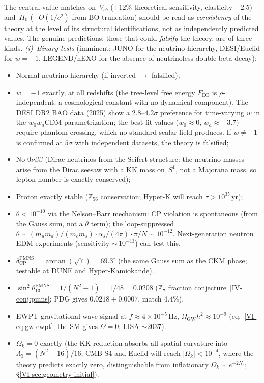 \noindent
The central-value matches on~$V_{cb}$
($\pm 12\%$ theoretical sensitivity, elasticity $-2.5$) and~$H_0$
($\pm O(1/c^2)$ from BO truncation) should be read as
\emph{consistency} of the theory at the level of its
structural identifications, not as independently
predicted values.  The genuine predictions, those that
could \emph{falsify} the theory, are of three kinds.
\emph{(i)~Binary tests}
(imminent: JUNO for the neutrino hierarchy,
DESI/Euclid for $w = -1$,
LEGEND/nEXO for the absence of neutrinoless double beta decay):
\begin{itemize}
\item Normal neutrino hierarchy (if inverted $\to$ falsified);
\item $w = -1$ exactly, at all redshifts
  (the tree-level free energy $F_{\mathrm{DE}}$ is
  $\rho$-independent: a cosmological constant with no
  dynamical component).
  The DESI DR2 BAO data (2025) show a
  $2.8$--$4.2\sigma$ preference for time-varying $w$
  in the $w_0 w_a$CDM parametrization;
  the best-fit values ($w_0 \approx 0$, $w_a \approx -3.7$)
  require phantom crossing, which no standard scalar field
  produces.
  If $w \ne -1$ is confirmed at $5\sigma$ with independent
  datasets, the theory is falsified;
\item No $0\nu\beta\beta$ (Dirac neutrinos from the Seifert structure:
  the neutrino masses arise from the Dirac seesaw with a KK mass
  on~$S^1$, not a Majorana mass, so lepton number is exactly conserved);
\item Proton exactly stable ($\mathbb{Z}_{56}$ conservation;
  Hyper-K will reach $\tau > 10^{35}$\,yr);
\item $\bar\theta < 10^{-10}$ via the Nelson--Barr mechanism:
  CP violation is spontaneous (from the Gauss sum, not a $\theta$ term);
  the loop-suppressed $\bar\theta \sim (m_u m_d)/(m_c m_s) \cdot
  \alpha_s/(4\pi) \cdot \pi/N \sim 10^{-12}$.
  Next-generation neutron EDM experiments (sensitivity ${\sim}\,10^{-13}$)
  can test this.
\item $\delta_{\mathrm{CP}}^{\mathrm{PMNS}} = \arctan(\sqrt{7}) = 69.3^\circ$
  (the same Gauss sum as the CKM phase; testable at DUNE and Hyper-Kamiokande).
\item $\sin^2\theta_{13}^{\mathrm{PMNS}} = 1/(N^2{-}1) = 1/48 = 0.0208$
  ($\mathbb{Z}_7$ fraction conjecture~\ref*{IV-conj:pmns};
  PDG gives $0.0218 \pm 0.0007$, match $4.4\%$).
\item EWPT gravitational wave signal at
  $f \approx 4 \times 10^{-5}$\,Hz,
  $\Omega_{\mathrm{GW}} h^2 \approx 10^{-9}$
  (eq.~\eqref{VI-eq:gw-ewpt};
  the SM gives $\Omega = 0$; LISA $\sim\!2037$).
\item $\Omega_k = 0$ exactly
  (the KK reduction absorbs all spatial curvature into
  $\Lambda_3 = (N^2{-}16)/16$;
  CMB-S4 and Euclid will reach $|\Omega_k| < 10^{-4}$,
  where the theory predicts exactly zero,
  distinguishable from inflationary
  $\Omega_k \sim e^{-2N_e}$;
  \S\ref{VI-sec:geometry-initial}).
\end{itemize}
